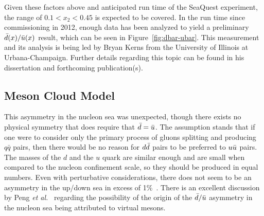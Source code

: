 Given these factors above and anticipated run time of the SeaQuest experiment, the range of $0.1<x_2<0.45$ is expected to be covered. In the run time since commissioning in 2012, enough data has been analyzed to yield a preliminary $\bar{d}(x)/\bar{u}(x)$ result, which can be seen in Figure~\ref{fig:dbar-ubar}. This measurement and its analysis is being led by Bryan Kerns from the University of Illinois at Urbana-Champaign. Further details regarding this topic can be found in his dissertation and forthcoming publication(s).

\subsection{Meson Cloud Model}

This asymmetry in the nucleon sea was unexpected, though there exists no physical symmetry that does require that $\bar{d}=\bar{u}$. The assumption stands that if one were to consider only the primary process of gluons splitting and producing $q\bar{q}$ pairs, then there would be no reason for $d\bar{d}$ pairs to be preferred to $u\bar{u}$ pairs. The masses of the $d$ and the $u$ quark are similar enough and are small when compared to the nucleon confinement scale, so they should be produced in equal numbers. Even with perturbative considerations, there does not seem to be an asymmetry in the up/down sea in excess of 1\%~\cite{Ross:1978xk}. There is an excellent discussion by Peng \emph{et al.}~\cite{Peng:1998pa} regarding the possibility of the origin of the $\bar{d}/\bar{u}$ asymmetry in the nucleon sea being attributed to virtual mesons.

